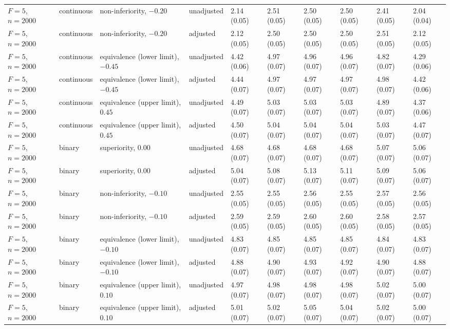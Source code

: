 \begin{landscape}
\begin{singlespace}
\begin{longtable}{@{}llllllllll@{}}
$F=5$, $n=2000$ & continuous & non-inferiority, $-0.20$ & unadjusted & 2.14 (0.05) & 2.51 (0.05) & 2.50 (0.05) & 2.50 (0.05) & 2.41 (0.05) & 2.04 (0.04)\\
$F=5$, $n=2000$ & continuous & non-inferiority, $-0.20$ & adjusted & 2.12 (0.05) & 2.50 (0.05) & 2.50 (0.05) & 2.50 (0.05) & 2.51 (0.05) & 2.12 (0.05)\\
$F=5$, $n=2000$ & continuous & equivalence (lower limit), $-0.45$ & unadjusted & 4.42 (0.06) & 4.97 (0.07) & 4.96 (0.07) & 4.96 (0.07) & 4.82 (0.07) & 4.29 (0.06)\\
$F=5$, $n=2000$ & continuous & equivalence (lower limit), $-0.45$ & adjusted & 4.44 (0.07) & 4.97 (0.07) & 4.97 (0.07) & 4.97 (0.07) & 4.98 (0.07) & 4.42 (0.06)\\
$F=5$, $n=2000$ & continuous & equivalence (upper limit), $0.45$ & unadjusted & 4.49 (0.07) & 5.03 (0.07) & 5.03 (0.07) & 5.03 (0.07) & 4.89 (0.07) & 4.37 (0.06)\\
$F=5$, $n=2000$ & continuous & equivalence (upper limit), $0.45$ & adjusted & 4.50 (0.07) & 5.04 (0.07) & 5.04 (0.07) & 5.04 (0.07) & 5.03 (0.07) & 4.47 (0.07)\\
$F=5$, $n=2000$ & binary & superiority, $0.00$ & unadjusted & 4.68 (0.07) & 4.68 (0.07) & 4.68 (0.07) & 4.68 (0.07) & 5.07 (0.07) & 5.06 (0.07)\\
$F=5$, $n=2000$ & binary & superiority, $0.00$ & adjusted & 5.04 (0.07) & 5.08 (0.07) & 5.13 (0.07) & 5.11 (0.07) & 5.09 (0.07) & 5.06 (0.07)\\
$F=5$, $n=2000$ & binary & non-inferiority, $-0.10$ & unadjusted & 2.55 (0.05) & 2.55 (0.05) & 2.56 (0.05) & 2.55 (0.05) & 2.57 (0.05) & 2.56 (0.05)\\
$F=5$, $n=2000$ & binary & non-inferiority, $-0.10$ & adjusted & 2.59 (0.05) & 2.59 (0.05) & 2.60 (0.05) & 2.60 (0.05) & 2.58 (0.05) & 2.57 (0.05)\\
$F=5$, $n=2000$ & binary & equivalence (lower limit), $-0.10$ & unadjusted & 4.83 (0.07) & 4.85 (0.07) & 4.85 (0.07) & 4.85 (0.07) & 4.84 (0.07) & 4.83 (0.07)\\
$F=5$, $n=2000$ & binary & equivalence (lower limit), $-0.10$ & adjusted & 4.88 (0.07) & 4.90 (0.07) & 4.93 (0.07) & 4.92 (0.07) & 4.90 (0.07) & 4.88 (0.07)\\
$F=5$, $n=2000$ & binary & equivalence (upper limit), $0.10$ & unadjusted & 4.97 (0.07) & 4.98 (0.07) & 4.98 (0.07) & 4.98 (0.07) & 5.02 (0.07) & 5.00 (0.07)\\
$F=5$, $n=2000$ & binary & equivalence (upper limit), $0.10$ & adjusted & 5.01 (0.07) & 5.02 (0.07) & 5.05 (0.07) & 5.04 (0.07) & 5.02 (0.07) & 5.00 (0.07)\\
\end{longtable}
\endgroup\end{singlespace}\end{landscape}
